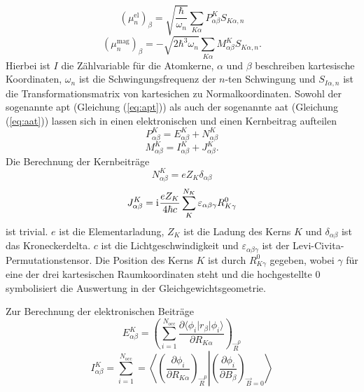 	\begin{equation}\label{eq:eludm}
	  (\mu_n^{\text{el}})_\beta=\sqrt{\frac{\hbar}{\omega_n}}\sum_{K\alpha}P_{\alpha\beta}^K S_{K\alpha,n}
	\end{equation}
	\begin{equation}\label{eq:emagudm}
	  (\mu_n^{\text{mag}})_\beta=-\sqrt{2\hbar^3\omega_n}\sum_{K\alpha}M_{\alpha\beta}^KS_{K\alpha,n}.
	\end{equation}
	Hierbei ist $I$ die Zählvariable für die Atomkerne, $\alpha$ und $\beta$ beschreiben kartesische Koordinaten, $\omega_n$ ist die Schwingungsfrequenz der $n$-ten Schwingung und $S_{I\alpha,n}$ ist die Transformationsmatrix von kartesichen zu Normalkoordinaten. Sowohl der sogenannte \ac{apt} (Gleichung (\ref{eq:apt})) als auch der sogenannte \ac{aat} (Gleichung (\ref{eq:aat})) lassen sich in einen elektronischen und einen Kernbeitrag aufteilen
	\begin{equation}\label{eq:apt}
	  P^K_{\alpha\beta}=E^K_{\alpha\beta}+N^K_{\alpha\beta}
	\end{equation}
	\begin{equation}\label{eq:aat}
   	  M^K_{\alpha\beta}=I^K_{\alpha\beta}+J^K_{\alpha\beta}.
	\end{equation}
	Die Berechnung der Kernbeiträge 
	\begin{equation}
	  N^K_{\alpha\beta}=eZ_K\delta_{\alpha\beta}
	\end{equation}
	\begin{equation}\label{eq:aatkern}
	  J^K_{\alpha\beta}=\mathrm{i}\mkern1mu\frac{eZ_K}{4\hbar c}\sum_K^{N_K}\varepsilon_{\alpha\beta\gamma}R^0_{K\gamma}
	\end{equation}
	ist trivial. $e$ ist die Elementarladung, $Z_K$ ist die Ladung des Kerns $K$ und $\delta_{\alpha\beta}$ ist das Kroneckerdelta. $c$ ist die Lichtgeschwindigkeit und $\varepsilon_{\alpha\beta\gamma}$ ist der Levi-Civita-Permutationstensor. Die Position des Kerns $K$ ist durch $R^0_{K\gamma}$ gegeben, wobei $\gamma$ für eine der drei kartesischen Raumkoordinaten steht und die hochgestellte $0$ symbolisiert die Auswertung in der Gleichgewichtsgeometrie.   
	
    Zur Berechnung der elektronischen Beiträge 
    \begin{equation}
      E^K_{\alpha\beta}=\left(\sum_{i=1}^{N_{\text{occ}}}\frac{\partial \langle\phi_i\vert r_\beta\vert\phi_i\rangle}{\partial R_{K\alpha}}\right)_{\vec{R}^0}
    \end{equation}
    \begin{equation}\label{eq:vcdaatel}
      I^K_{\alpha\beta}=\sum_{i=1}^{N_{\text{occ}}}=\left\langle\left.\left(\frac{\partial \phi_i}{\partial R_{K\alpha}}\right)_{\vec{R}^0}\right|\left(\frac{\partial \phi_i}{\partial B_\beta}\right)_{\vec{B}=0}\right\rangle
    \end{equation}
    
